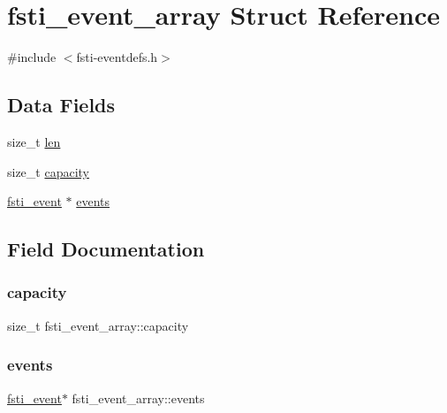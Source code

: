 \hypertarget{structfsti__event__array}{}\section{fsti\+\_\+event\+\_\+array Struct Reference}
\label{structfsti__event__array}


{\ttfamily \#include $<$fsti-\/eventdefs.\+h$>$}

\subsection*{Data Fields}
\begin{DoxyCompactItemize}
\item 
size\+\_\+t \mbox{\hyperlink{structfsti__event__array_ada6ee09934336597d954b693677a93ad}{len}}
\item 
size\+\_\+t \mbox{\hyperlink{structfsti__event__array_aa84e4bbb164ccb3c949f051f5ef4db5e}{capacity}}
\item 
\mbox{\hyperlink{fsti-eventdefs_8h_abce6b23e84620b4f4433c952fa10f0b9}{fsti\+\_\+event}} $\ast$ \mbox{\hyperlink{structfsti__event__array_a71cfad0ae250352091479f8bfebd6fcb}{events}}
\end{DoxyCompactItemize}


\subsection{Field Documentation}
\mbox{\label{structfsti__event__array_aa84e4bbb164ccb3c949f051f5ef4db5e}} 
\subsubsection{\texorpdfstring{capacity}{capacity}}
{\footnotesize\ttfamily size\+\_\+t fsti\+\_\+event\+\_\+array\+::capacity}

\mbox{\label{structfsti__event__array_a71cfad0ae250352091479f8bfebd6fcb}} 
\subsubsection{\texorpdfstring{events}{events}}
{\footnotesize\ttfamily \mbox{\hyperlink{fsti-eventdefs_8h_abce6b23e84620b4f4433c952fa10f0b9}{fsti\+\_\+event}}$\ast$ fsti\+\_\+event\+\_\+array\+::events}

